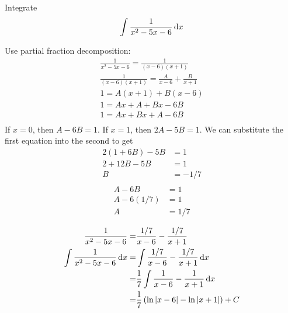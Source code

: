 \begin{ex}
  Integrate
  \[ \int \frac{1}{x^2-5x-6}\,\mathrm{d} x \]
  \begin{sol}
    Use partial fraction decomposition:
    \begin{align*}
    \frac{1}{x^2-5x-6} = \frac{1}{(x-6)(x+1)}\\
    \frac{1}{(x-6)(x+1)} = \frac{A}{x-6}+\frac{B}{x+1} \\
    1 = A(x+1)+B(x-6) \\
    1 = Ax+A+Bx-6B \\
    1 = Ax+Bx+A-6B \\
    \end{align*}
    If $x=0$, then $A-6B=1$. If $x=1$, then $2A-5B=1$. We can substitute the first equation into the second to get
    \begin{align*}
      2(1+6B)-5B&=1 \\
      2+12B-5B&=1 \\
      B&=-1/7 \\
    \end{align*}
    \begin{align*}
      A-6B&=1 \\
      A-6(1/7)&=1 \\
      A&=1/7 \\
    \end{align*}
    \begin{align*}
      \frac{1}{x^2-5x-6}=&\frac{1/7}{x-6}-\frac{1/7}{x+1} \\
      \int \frac{1}{x^2-5x-6}\,\mathrm{d} x=&\int  \frac {1/7}{x-6}-\frac{1/7}{x+1} \,\mathrm{d} x \\
      =& \frac{1}{7} \int \frac{1}{x-6}-\frac{1}{x+1}\,\mathrm{d} x \\
      =& \frac{1}{7}\left(\ln{|x-6|}-\ln{|x+1|}\right)+C
    \end{align*}
  \end{sol}
\end{ex}
